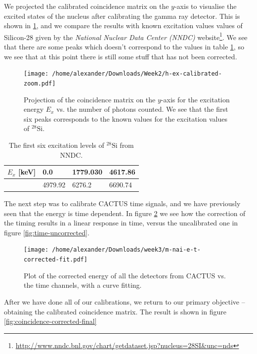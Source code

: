 \documentclass[a4paper,12pt]{article}
\begin{document}
We projected the calibrated coincidence matrix on the $y$-axis
to visualise the excited states of the nucleus after
calibrating the gamma ray detector. This is shown in
\ref{fig:excited-states}, and we compare the results
with known excitation values values of Silicon-28 given by the 
\textit{National Nuclear Data Center (NNDC)}
website\footnote{\url{http://www.nndc.bnl.gov/chart/getdataset.jsp?nucleus=28SI&unc=nds}}. 
We see that there are some peaks which doesn't correspond
to the values in table \ref{tab:excited-nucleii},
so we see that at this point 
there is still some stuff that has not been corrected.

\begin{figure}[H]
    \centering
    \texttt{[image: /home/alexander/Downloads/Week2/h-ex-calibrated-zoom.pdf]}
    \caption{Projection of the coincidence matrix on the $y$-axis
    for the excitation energy $E_x$ vs. the number of photons counted.
    We see that the first six peaks corresponds to the known
    values for the excitation values of $^{28}\text{Si}$.}
    \label{fig:excited-states}
\end{figure}

\begin{table}[h!]
    \centering
    \begin{tabularx}{\columnwidth}{| X | X | X | X |}
        \hline
        $E_x$ [keV] & 0.0 & 1779.030 & 4617.86 \\ \hline
        & 4979.92 & 6276.2 & 6690.74\\
        \hline
    \end{tabularx}
    \caption{The first six excitation levels of $^{28}\text{Si}$ 
        from NNDC.}
    \label{tab:excited-nucleii}
\end{table}

The next step was to calibrate CACTUS time signals,
and we have previously seen that the energy is time dependent.
In figure \ref{fig:time-corrected} we see how the correction of the
timing results in a linear response in time,
versus the uncalibrated one in figure \ref{fig:time-uncorrected}.

\begin{figure}[H]
    \centering
    \texttt{[image: /home/alexander/Downloads/week3/m-nai-e-t-corrected-fit.pdf]}
    \caption{Plot of the corrected energy of all the detectors from CACTUS 
        vs. the time channels, with a curve fitting.}
    \label{fig:time-corrected}
\end{figure}

After we have done all of our calibrations, we return to our
primary objective -- obtaining the calibrated coincidence matrix.
The result is shown in figure \ref{fig:coincidence-corrected-final}
\end{document}
